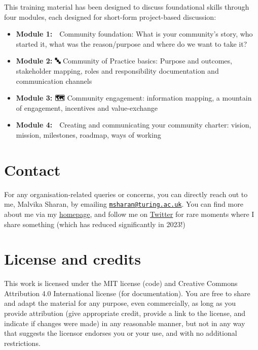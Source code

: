 \documentclass[
  letterpaper,
  DIV=11,
  numbers=noendperiod]{scrreport}
\providecommand{\tightlist}{%
  \setlength{\itemsep}{0pt}\setlength{\parskip}{0pt}}\usepackage{longtable,booktabs,array}
\begin{document}
This training material has been designed to discuss foundational skills
through four modules, each designed for short-form project-based
discussion:

\begin{itemize}
\tightlist
\item
  \textbf{Module 1: 🚧} Community foundation: What is your community's
  story, who started it, what was the reason/purpose and where do we
  want to take it?
\item
  \textbf{Module 2: 🔤} Community of Practice basics: Purpose and
  outcomes, stakeholder mapping, roles and responsibility documentation
  and communication channels
\item
  \textbf{Module 3: 🗺} Community engagement: information mapping, a
  mountain of engagement, incentives and value-exchange
\item
  \textbf{Module 4: 📜} Creating and communicating your community
  charter: vision, mission, milestones, roadmap, ways of working
\end{itemize}

\hypertarget{contact}{%
\section{Contact}\label{contact}}

For any organisation-related queries or concerns, you can directly reach
out to me, Malvika Sharan, by emailing
\href{mailto:msharan@turing.ac.uk}{\nolinkurl{msharan@turing.ac.uk}}.
You can find more about me via my
\href{https://malvikasharan.github.io/}{homepage}, and follow me on
\href{https://twitter.com/MalvikaSharan}{Twitter} for rare moments where
I share something (which has reduced significantly in 2023!)

\hypertarget{license-and-credits}{%
\section{License and credits}\label{license-and-credits}}

This work is licensed under the MIT license (code) and Creative Commons
Attribution 4.0 International license (for documentation). You are free
to share and adapt the material for any purpose, even commercially, as
long as you provide attribution (give appropriate credit, provide a link
to the license, and indicate if changes were made) in any reasonable
manner, but not in any way that suggests the licensor endorses you or
your use, and with no additional restrictions.
\end{document}
